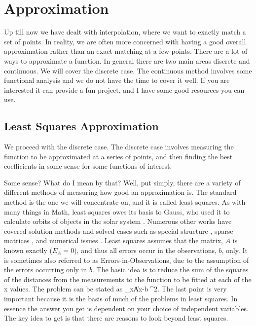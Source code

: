 \chapter{Approximation}\label{c-Approx}

Up till now we have dealt with interpolation, where we want to exactly match a set of points.  In reality, we are often more concerned with having a good overall approximation rather than an exact matching at a few points.  There are a lot of ways to approximate a function.  In general there are two main areas discrete and continuous.  We will cover the discrete case.  The continuous method involves some functional analysis and we do not have the time to cover it well.  If you are interested it can provide a fun project, and I have some good resources you can use.

\section{Least Squares Approximation}

We proceed with the discrete case.  The discrete case involves measuring the function to be approximated at a series of points, and then finding the best coefficients in some sense for some functions of interest.

Some sense?  What do I mean by that?  Well, put simply, there are a variety of different methods of measuring how good an approximation is.  The standard method is the one we will concentrate on, and it is called least squares.  As with many things in Math, least squares owes its basis to Gauss, who used it to calculate orbits of objects in the solar system .  Numerous other works have covered solution methods  and solved cases such as special structure , sparse matrices , and numerical issues .  Least squares assumes that the matrix, $A$ is known exactly ($E_{A} = 0$), and thus all errors occur in the observations, $b$, only.  It is sometimes also referred to as Errors-in-Observations, due to the assumption of the errors occurring only in $b$.  The basic idea is to reduce the sum of the squares of the distances from the measurements to the function to be fitted at each of the x values.  The problem can be stated as
\beq
\min_{x}\| Ax-b \|^{2}.
\eeq
The last point is very important because it is the basis of much of the problems in least squares.  In essence the answer you get is dependent on your choice of independent variables.  The key idea to get is that there are reasons to look beyond least squares.

